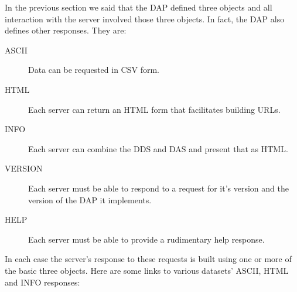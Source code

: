 \documentclass{dods-paper}
\begin{document}

In the previous section we said that the DAP defined three objects and
all interaction with the server involved those three objects. In fact,
the DAP also defines other responses. They are:

\begin{description}
\item[ASCII] Data can be requested in CSV form.
\item[HTML] Each server can return an HTML form that facilitates building
 URLs.
\item[INFO] Each server can combine the DDS and DAS and present that as 
HTML.
\item[VERSION] Each server must be able to respond to a request for it's
  version and the version of the DAP it implements.
\item[HELP] Each server must be able to provide a rudimentary help response.
\end{description}

In each case the server's response to these requests is built using
one or more of the basic three objects.  Here are some links to
various datasets' ASCII, HTML and INFO responses:
\end{document}
